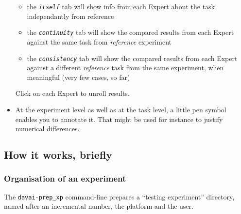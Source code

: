 \documentclass[a4paper,10pt,twoside]{article}
\begin{document}
\begin{itemize}
 \begin{itemize}
  \item the \textit{\texttt{itself}} tab will show info from each Expert about the task independantly from reference
  \item the \textit{\texttt{continuity}} tab will show the compared results from each Expert against the same task from \textit{reference} experiment
  \item the \textit{\texttt{consistency}} tab will show the compared results from each Expert against a different \textit{reference} task from the same experiment, when meaningful (very few cases, so far)
 \end{itemize}
 Click on each Expert to unroll results.
 \item At the experiment level as well as at the task level, a little pen symbol enables you to annotate it. That might be used for instance to justify numerical differences.
\end{itemize}





\newpage
\subsection{How it works, briefly}
\subsubsection{Organisation of an experiment}
The \texttt{davai-prep\_xp} command-line prepares a ``testing experiment'' directory, named after an incremental number, the platform and the user.
\end{document}
